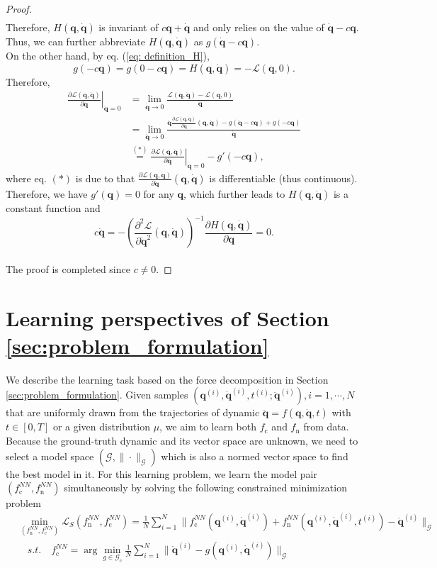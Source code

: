 \documentclass[aps,pre,reprint,superscriptaddress,nofootinbib,amsmath,amssymb]{revtex4-2}
\newcommand{\mat}[1]{\mathbf{#1}}
\newcommand{\q}{\mat{q}}
\newcommand{\qd}{\dot{\mat{q}}}
\newcommand{\qdd}{\ddot{\mat{q}}}
\newcommand{\lag}{\mathcal{L}}
\begin{document}
\begin{proof}
\begin{align*}
	\end{align*}
	Therefore, $H(\q,\qd)$ is invariant of $c\q+\qd$ and only relies on the value of $\qd-c\q$. Thus, we can further abbreviate $H(\q,\qd)$ as $g(\qd-c\q)$.
	\\
	On the other hand, by eq. (\ref{eq: definition_H}), 
	\begin{equation*}
	    g(-c\q)=g(0-c\q)=H(\q,\qd)=-\lag(\q,0).
	\end{equation*}
	Therefore,
	\begin{align*}
		\left.\frac{\partial \lag(\q,\qd)}{\partial \qd}\right|_{\qd=0}&=\lim_{\qd\rightarrow 0} \frac{\lag(\q,\qd)-\lag(\q,0)}{\qd }
		\\ 
		&=\lim_{\qd\rightarrow 0} \frac{\qd \frac{\partial \lag(\q,\qd)}{\partial\qd}(\q,\qd)-g(\qd-c\q)+g(-c\q)}{\qd}
		\\
		&\overset{(*)}{=}\left.\frac{\partial \lag(\q,\qd)}{\partial \qd}\right|_{\qd=0}- g'(-c\q),
	\end{align*}
	where eq. $(*)$ is due to that $ \frac{\partial \lag(\q,\qd)}{\partial\qd}(\q,\qd)$ is differentiable (thus continuous).
	\\
	Therefore, we have $g'(\q)=0$ for any $\q$, which further leads to $H(\q,\qd)$ is a constant function and 
	\begin{equation*}
		c\qd=-\left(\frac{\partial^2 \lag}{\partial \qd^2}(\q,\qd)\right)^{-1} \frac{\partial H(\q,\qd)}{\partial \q}=0.
	\end{equation*}
	\\
	The proof is completed since $c\ne 0$.
\end{proof}


\section{Learning perspectives of Section \ref{sec:problem_formulation}}\label{sec:learning_perspective}

We describe the learning task based on the force decomposition in Section \ref{sec:problem_formulation}. Given samples $(\q^{(i)},\qd^{(i)},t^{(i)};\qdd^{(i)}), i=1,\cdots, N$ that are uniformly drawn from the trajectories of dynamic $\qdd=f(\q,\qd,t)$ with $t\in[0, T]$ or a given distribution $\mu$, we aim to learn both $f_{\mathrm{c}}$ and $f_{\mathrm{n}}$ from data. Because the ground-truth dynamic and its vector space are unknown, we need to select a model space $(\mathcal{G},\|\cdot\|_{\mathcal{G}})$ which is also a normed vector space to find the best model in it. For this learning problem, we learn the model pair $(f_{\mathrm{c}}^{NN},f_{\mathrm{n}}^{NN})$ simultaneously by solving the following constrained minimization problem
{\small\begin{align}
		& \min_{(f_{\mathrm{n}}^{NN},f_{\mathrm{c}}^{NN})}\mathcal{L}_S(f_{\mathrm{n}}^{NN},f_{\mathrm{c}}^{NN})=
		\frac{1}{N}\sum_{i=1}^N\|f_{\mathrm{c}}^{NN}(\q^{(i)},\qd^{(i)})+f_{\mathrm{n}}^{NN}(\q^{(i)},\qd^{(i)},t^{(i)})-\qdd^{(i)}\|_{\mathcal{G}}
		\nonumber\\
		&\quad\textit{s.t.}\quad f_{\mathrm{c}}^{NN}=\arg\min_{g\in\mathcal{G}_c}\frac{1}{N}\sum_{i=1}^N\|\qdd^{(i)}-g(\q^{(i)},\qd^{(i)})\|_{\mathcal{G}}\nonumber
\end{align}}
\end{document}
